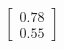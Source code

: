 \documentclass[preview]{standalone}
\begin{document}
\begin{align*}
\begin{bmatrix} 0.78 \\ 0.55 \end{bmatrix}
\end{align*}
\end{document}
